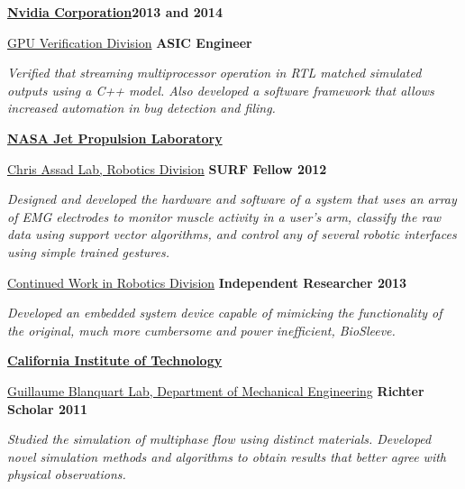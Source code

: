 \documentclass[10pt]{article}
\newenvironment{innerlist}[1][\enskip\textbullet]%
        {\begin{compactitem}[#1]}{\end{compactitem}}
\begin{document}
\textbf{\href{http://www.nvidia.com/}{Nvidia Corporation}}\hfill \textbf{2013 and 2014}
	\begin{innerlist}
		\item[] \href{http://www.geforce.com/hardware}{GPU Verification Division} \hfill \textbf{ASIC Engineer}
	\begin{innerlist}
	        \item[] \emph{Verified that streaming multiprocessor operation in RTL matched simulated outputs using a C++ model. Also developed a software framework that allows increased automation in bug detection and filing.}
	    \end{innerlist}
	\end{innerlist}
\textbf{\href{http://www.jpl.nasa.gov/}{NASA Jet Propulsion Laboratory}}
	\begin{innerlist}
		\item[] \href{https://www-robotics.jpl.nasa.gov/}{Chris Assad Lab, Robotics Division} \hfill \hfill \textbf{SURF Fellow 2012}
	    \begin{innerlist}
	        \item[] \emph{Designed and developed the hardware and software of a system that uses an array of EMG electrodes to monitor muscle activity in a user's arm, classify the raw data using support vector algorithms, and control any of several robotic interfaces using simple trained gestures.}
	    \end{innerlist}
        \item[] \href{https://www-robotics.jpl.nasa.gov/}{Continued Work in Robotics Division} \hfill \textbf{Independent Researcher 2013}
        \begin{innerlist}
	        \item[] \emph{Developed an embedded system device capable of mimicking the functionality of the original, much more cumbersome and power inefficient, BioSleeve.}
	    \end{innerlist}
	\end{innerlist}
\textbf{\href{http://caltech.edu/}{California Institute of Technology}}
    \begin{innerlist}
	    \item[] \href{http://www.theforce.caltech.edu/}{Guillaume Blanquart Lab, Department of Mechanical Engineering} \hfill \textbf{Richter Scholar 2011}
	    \begin{innerlist}
	        \item[] \emph{Studied the simulation of multiphase flow using distinct materials. Developed novel simulation methods and algorithms to obtain results that better agree with physical observations.}
	    \end{innerlist}
	\end{innerlist}	
\end{document}
